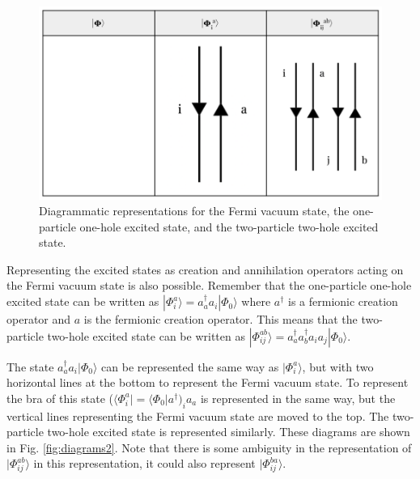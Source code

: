 \begin{figure}
    \centering
    \includegraphics[scale=0.25]{Images/Chapter2/Diagrams_1.png}
    \caption{Diagrammatic representations for the Fermi vacuum state, the one-particle one-hole excited state, and the two-particle two-hole excited state.}
    \label{fig:diagrams1}
\end{figure}

Representing the excited states as creation and annihilation operators acting on the Fermi vacuum state is also possible. Remember that the one-particle one-hole excited state can be written as $|\Phi_i^a\rangle = a_a^\dagger a_i|\Phi_0\rangle$ where $a^\dagger$ is a fermionic creation operator and $a$ is the fermionic creation operator. This means that the two-particle two-hole excited state can be written as $|\Phi_{ij}^{ab}\rangle = a^\dagger_aa^\dagger_ba_ia_j|\Phi_0\rangle$.

The state $a_a^\dagger a_i|\Phi_0\rangle$ can be represented the same way as $|\Phi_i^a\rangle$, but with two horizontal lines at the bottom to represent the Fermi vacuum state. To represent the bra of this state ($\langle \Phi_i^a| = \langle \Phi_0|a^\dagger)_ia_a$ is represented in the same way, but the vertical lines representing the Fermi vacuum state are moved to the top. The two-particle two-hole excited state is represented similarly. These diagrams are shown in Fig. \ref{fig:diagrams2}.  Note that there is some ambiguity in the representation of $|\Phi_{ij}^{ab}\rangle$ in this representation, it could also represent $|\Phi_{ij}^{ba}\rangle$.

